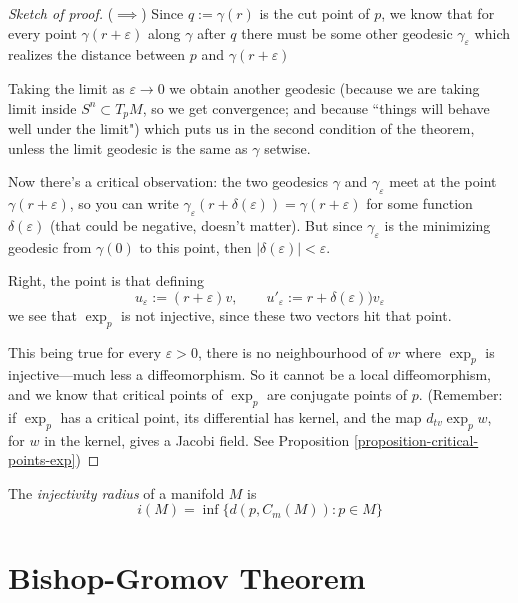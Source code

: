 \begin{proof}[Sketch of proof]
($\implies$) Since $q:=\gamma(r)$ is the cut point of $p$, we know that for every point
$\gamma(r+\varepsilon)$ along $\gamma$ after $q$ there must be some other geodesic
$\gamma_\varepsilon$ which realizes the distance between $p$ and
$\gamma(r+\varepsilon)$

Taking the limit as $\varepsilon \to 0$ we obtain another geodesic
(because we are taking limit inside $S^n \subset T_pM$, so we get convergence;
and because ``things will behave well under the limit")
which puts us in the second condition of the theorem,
unless the limit geodesic is the same as  $\gamma$ setwise.

Now there's a critical observation:
the two geodesics $\gamma$ and $\gamma_\varepsilon$ meet at the point 
 $\gamma(r+\varepsilon)$, so you can write
 $\gamma_\varepsilon(r+\delta(\varepsilon))=\gamma(r+\varepsilon)$
 for some function $\delta(\varepsilon)$ (that could be negative, doesn't
 matter).
 But since $\gamma_\varepsilon$ is the minimizing
 geodesic from $\gamma(0)$ to this point, then
 $|\delta(\varepsilon)|<\varepsilon$.

Right, the point is that defining
$$
u_\varepsilon:=(r+\varepsilon)v,\qquad
u'_\varepsilon:=r+\delta(\varepsilon))v_\varepsilon
$$
we see that $\operatorname{exp}_p$ is not injective, since these two vectors
hit that point.

This being true for every $\varepsilon>0$, there is no neighbourhood of $vr$ 
where $\operatorname{exp}_p$ is injective---much less a diffeomorphism.
So it cannot be a local diffeomorphism, and we know that critical points of
$\operatorname{exp}_p$ are conjugate points of $p$. (Remember: if
$\operatorname{exp}_p$ has a critical point, its differential has kernel,
and the map $d_{tv}\operatorname{exp}_pw$, for $w$ in the kernel, gives 
a Jacobi field. See Proposition \ref{proposition-critical-points-exp})
\end{proof}

\begin{definition}
\label{definition-injectivity-radius}
The {\it injectivity radius} of a manifold $M$ is
$$
i(M)=\operatorname{inf}\{d(p,C_m(M)):p \in M\}
$$
\end{definition}

\section{Bishop-Gromov Theorem}
\label{section-bishop-gromov}

